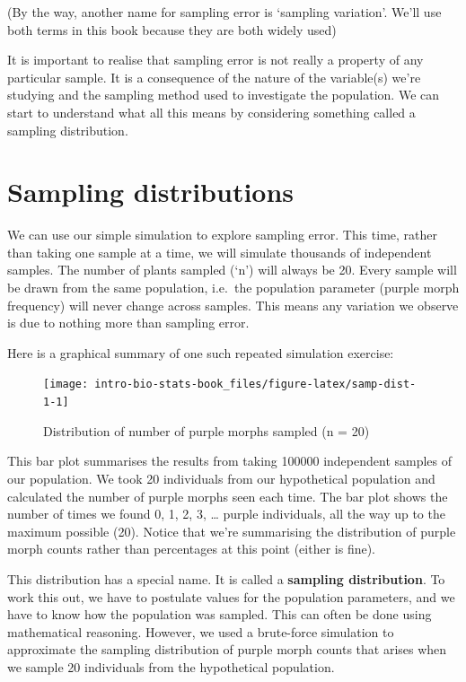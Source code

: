 \documentclass[
]{book}
\begin{document}
(By the way, another name for sampling error is `sampling variation'. We'll use both terms in this book because they are both widely used)

It is important to realise that sampling error is not really a property of any particular sample. It is a consequence of the nature of the variable(s) we're studying and the sampling method used to investigate the population. We can start to understand what all this means by considering something called a sampling distribution.

\hypertarget{sampling-distributions}{%
\section{Sampling distributions}\label{sampling-distributions}}

We can use our simple simulation to explore sampling error. This time, rather than taking one sample at a time, we will simulate thousands of independent samples. The number of plants sampled (`n') will always be 20. Every sample will be drawn from the same population, i.e.~the population parameter (purple morph frequency) will never change across samples. This means any variation we observe is due to nothing more than sampling error.

Here is a graphical summary of one such repeated simulation exercise:

\begin{figure}

{\centering \texttt{[image: intro-bio-stats-book\_files/figure-latex/samp-dist-1-1]} 

}

\caption{Distribution of number of purple morphs sampled (n = 20)}\label{fig:samp-dist-1}
\end{figure}

This bar plot summarises the results from taking 100000 independent samples of our population. We took 20 individuals from our hypothetical population and calculated the number of purple morphs seen each time. The bar plot shows the number of times we found 0, 1, 2, 3, \ldots{} purple individuals, all the way up to the maximum possible (20). Notice that we're summarising the distribution of purple morph counts rather than percentages at this point (either is fine).

This distribution has a special name. It is called a \textbf{sampling distribution}. To work this out, we have to postulate values for the population parameters, and we have to know how the population was sampled. This can often be done using mathematical reasoning. However, we used a brute-force simulation to approximate the sampling distribution of purple morph counts that arises when we sample 20 individuals from the hypothetical population.
\end{document}
